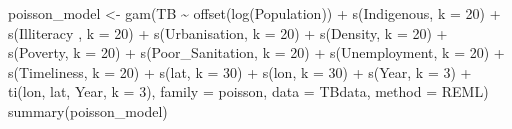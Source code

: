 \documentclass[
  letterpaper,
  DIV=11,
  numbers=noendperiod]{scrartcl}
\newenvironment{Shaded}{\begin{snugshade}}{\end{snugshade}}
\newcommand{\AttributeTok}[1]{\textcolor[rgb]{0.40,0.45,0.13}{#1}}
\newcommand{\DecValTok}[1]{\textcolor[rgb]{0.68,0.00,0.00}{#1}}
\newcommand{\FunctionTok}[1]{\textcolor[rgb]{0.28,0.35,0.67}{#1}}
\newcommand{\NormalTok}[1]{\textcolor[rgb]{0.00,0.23,0.31}{#1}}
\newcommand{\OtherTok}[1]{\textcolor[rgb]{0.00,0.23,0.31}{#1}}
\newcommand{\SpecialCharTok}[1]{\textcolor[rgb]{0.37,0.37,0.37}{#1}}
\newcommand{\StringTok}[1]{\textcolor[rgb]{0.13,0.47,0.30}{#1}}
\begin{document}
\begin{Shaded}
\begin{Highlighting}[]
\NormalTok{poisson\_model }\OtherTok{\textless{}{-}} \FunctionTok{gam}\NormalTok{(TB }\SpecialCharTok{\textasciitilde{}} \FunctionTok{offset}\NormalTok{(}\FunctionTok{log}\NormalTok{(Population)) }\SpecialCharTok{+} \FunctionTok{s}\NormalTok{(Indigenous, }\AttributeTok{k =} \DecValTok{20}\NormalTok{) }\SpecialCharTok{+} \FunctionTok{s}\NormalTok{(Illiteracy , }\AttributeTok{k =} \DecValTok{20}\NormalTok{) }\SpecialCharTok{+} \FunctionTok{s}\NormalTok{(Urbanisation, }\AttributeTok{k =} \DecValTok{20}\NormalTok{) }\SpecialCharTok{+} \FunctionTok{s}\NormalTok{(Density, }\AttributeTok{k =} \DecValTok{20}\NormalTok{) }\SpecialCharTok{+} \FunctionTok{s}\NormalTok{(Poverty, }\AttributeTok{k =} \DecValTok{20}\NormalTok{) }\SpecialCharTok{+} \FunctionTok{s}\NormalTok{(Poor\_Sanitation, }\AttributeTok{k =} \DecValTok{20}\NormalTok{) }\SpecialCharTok{+} \FunctionTok{s}\NormalTok{(Unemployment, }\AttributeTok{k =} \DecValTok{20}\NormalTok{) }\SpecialCharTok{+} \FunctionTok{s}\NormalTok{(Timeliness, }\AttributeTok{k =} \DecValTok{20}\NormalTok{) }\SpecialCharTok{+} \FunctionTok{s}\NormalTok{(lat, }\AttributeTok{k =} \DecValTok{30}\NormalTok{) }\SpecialCharTok{+} \FunctionTok{s}\NormalTok{(lon, }\AttributeTok{k =} \DecValTok{30}\NormalTok{) }\SpecialCharTok{+} \FunctionTok{s}\NormalTok{(Year, }\AttributeTok{k =} \DecValTok{3}\NormalTok{) }\SpecialCharTok{+} \FunctionTok{ti}\NormalTok{(lon, lat, Year, }\AttributeTok{k =} \DecValTok{3}\NormalTok{), }\AttributeTok{family =}\NormalTok{ poisson, }\AttributeTok{data =}\NormalTok{ TBdata, }\AttributeTok{method =} \StringTok{\textquotesingle{}REML\textquotesingle{}}\NormalTok{)}
\FunctionTok{summary}\NormalTok{(poisson\_model)}
\end{Highlighting}
\end{Shaded}
\end{document}
